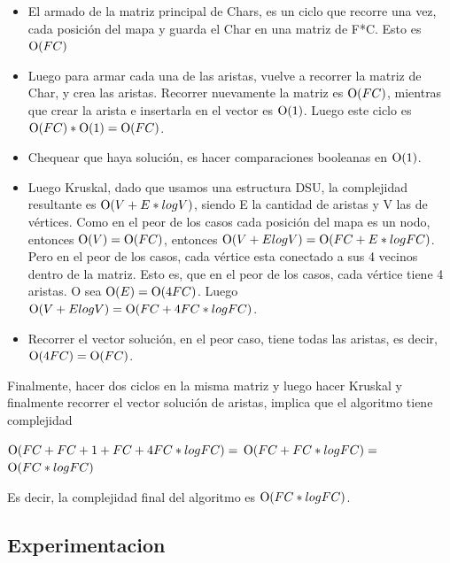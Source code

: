 	\begin{itemize}
	 \item El armado de la matriz principal de Chars, es un ciclo que recorre una vez, cada posición del mapa y guarda el Char en una matriz de F*C. Esto es $\operatorname{O}(FC)$
	 \item Luego para armar cada una de las aristas, vuelve a recorrer la matriz de Char, y crea las aristas. Recorrer nuevamente la matriz es $\operatorname{O}(FC)$, mientras que crear la arista e insertarla en el vector es $\operatorname{O}(1)$. Luego este ciclo es $\operatorname{O}(FC) * \operatorname{O}(1) = \operatorname{O}(FC)$.
	 \item Chequear que haya solución, es hacer comparaciones booleanas en $\operatorname{O}(1)$.
	 \item Luego Kruskal, dado que usamos una estructura DSU, la complejidad resultante es $\operatorname{O}(V + E*log V )$, siendo E la cantidad de aristas y V las de vértices. Como en el peor de los casos cada posición del mapa es un nodo, entonces $\operatorname{O}(V) = \operatorname{O}(FC)$, entonces $\operatorname{O}(V + E log V ) = \operatorname{O}(FC + E*log FC)$. Pero en el peor de los casos, cada vértice esta conectado a sus 4 vecinos dentro de la matriz. Esto es, que en el peor de los casos, cada vértice tiene 4 aristas. O sea $\operatorname{O}(E) = \operatorname{O}(4FC)$. Luego $\operatorname{O}(V + E log V ) = \operatorname{O}(FC + 4FC*log FC)$.
	 \item Recorrer el vector solución, en el peor caso, tiene todas las aristas, es decir, $\operatorname{O}(4FC) = \operatorname{O}(FC)$.

	\end{itemize}

	Finalmente, hacer dos ciclos en la misma matriz y luego hacer Kruskal y finalmente recorrer el vector solución de aristas, implica que el algoritmo tiene complejidad\par

	$\operatorname{O}(FC + FC + 1 + FC + 4FC*log FC) =$
	$\operatorname{O}(FC + FC*log FC) =$
	$\operatorname{O}(FC*log FC)$

	Es decir, la complejidad final del algoritmo es $\operatorname{O}(FC*log FC)$.



    \subsection{Experimentacion}
         

